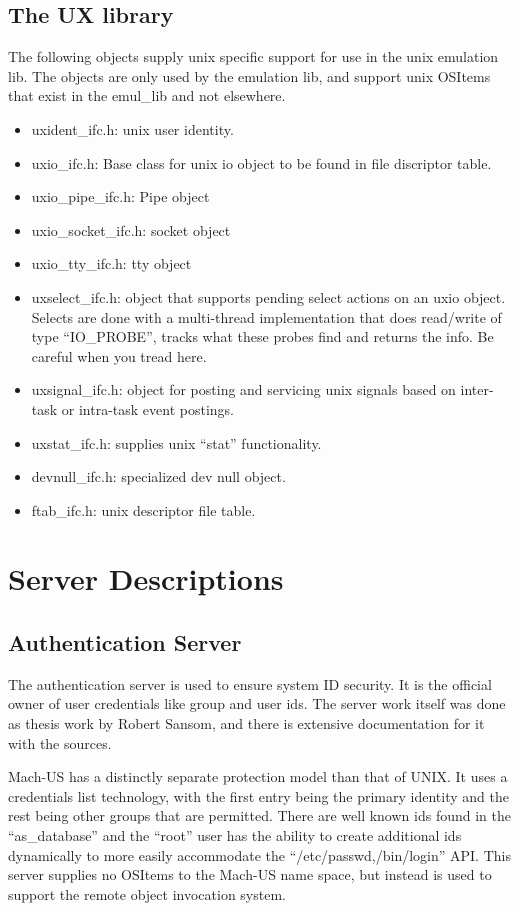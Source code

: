 \subsection{The UX library}
The following objects supply unix specific support for use in the unix
emulation lib.  The objects are only used by the emulation lib, and support
unix OSItems that exist in the emul\_lib and not elsewhere.
\begin{itemize}
\item{uxident\_ifc.h}: unix user identity.
\item{uxio\_ifc.h}: Base class for unix io object to be found in
file discriptor table.
\item{uxio\_pipe\_ifc.h}:  Pipe object
\item{uxio\_socket\_ifc.h}: socket object
\item{uxio\_tty\_ifc.h}: tty object
\item{uxselect\_ifc.h}: object that supports pending select actions on an uxio
object.  Selects are done with a multi-thread implementation that does
read/write of type ``IO\_PROBE'', tracks what these probes find and
returns the info.  Be careful when you tread here.
\item{uxsignal\_ifc.h}: object for posting and servicing unix signals based on
inter-task or intra-task event postings.
\item{uxstat\_ifc.h}: supplies unix ``stat'' functionality.
\item{devnull\_ifc.h}: specialized dev null object.
\item{ftab\_ifc.h}: unix descriptor file table.
\end{itemize}

\section{Server Descriptions}
\label{sec:servers}
\subsection{Authentication Server}
The authentication server is used to ensure system ID security.
It is the official owner of user credentials like group and user ids.
The server work itself was done as thesis work by Robert Sansom, and there
is extensive documentation for it with the sources.

Mach-US has a distinctly separate protection model than that of UNIX.  It
uses a credentials list technology, with the first entry being the primary
identity and the rest being other groups that are permitted.  There are
well known ids found in the ``as\_database'' and the ``root'' user has the
ability to create additional ids dynamically to more easily accommodate
the ``/etc/passwd,/bin/login'' API.
This server supplies no OSItems to the Mach-US name space, but instead is
used to support the remote object invocation system.

